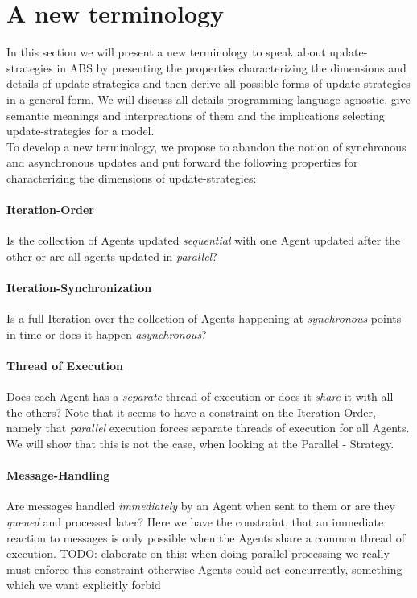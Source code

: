 \section{A new terminology}
In this section we will present a new terminology to speak about update-strategies in ABS by presenting the properties characterizing the dimensions and details of update-strategies and then derive all possible forms of update-strategies in a general form. We will discuss all details programming-language agnostic, give semantic meanings and interpreations of them and the implications selecting update-strategies for a model. \\
To develop a new terminology, we propose to abandon the notion of synchronous and asynchronous updates and put forward the following properties for characterizing the dimensions of update-strategies:

\paragraph{Iteration-Order}
Is the collection of Agents updated \textit{sequential} with one Agent updated after the other or are all agents updated in \textit{parallel}?

\paragraph{Iteration-Synchronization}
Is a full Iteration over the collection of Agents happening at \textit{synchronous} points in time or does it happen \textit{asynchronous}?

\paragraph{Thread of Execution}
Does each Agent has a \textit{separate} thread of execution or does it \textit{share} it with all the others? Note that it seems to have a constraint on the Iteration-Order, namely that \textit{parallel} execution forces separate threads of execution for all Agents. We will show that this is not the case, when looking at the Parallel - Strategy.

\paragraph{Message-Handling}
Are messages handled \textit{immediately} by an Agent when sent to them or are they \textit{queued} and processed later? Here we have the constraint, that an immediate reaction to messages is only possible when the Agents share a common thread of execution. TODO: elaborate on this: when doing parallel processing we really must enforce this constraint otherwise Agents could act concurrently, something which we want explicitly forbid

